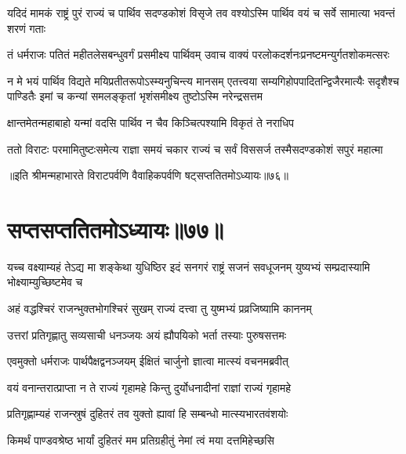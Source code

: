 \threelineshloka
{यदिदं मामकं राष्ट्रं पुरं राज्यं च पार्थिव}
{सदण्डकोशं विसृजे तव वश्योऽस्मि पार्थिव}
{वयं च सर्वे सामात्या भवन्तं शरणं गताः}



\twolineshloka
{तं धर्मराजः पतितं महीतलेसबन्धुवर्गं प्रसमीक्ष्य पार्थिवम्}
{उवाच वाक्यं परलोकदर्शनःप्रनष्टमन्युर्गतशोकमत्सरः}


\threelineshloka
{न मे भयं पार्थिव विद्यते मयिप्रतीतरूपोऽस्म्यनुचिन्त्य मानसम्}
{एतत्त्वया सम्यगिहोपपादितन्द्विजैरमात्यैः सदृशैश्च पाण्डितैः}
{इमां च कन्यां समलङ्कृतां भृशंसमीक्ष्य तुष्टोऽस्मि नरेन्द्रसत्तम}


\twolineshloka
{क्षान्तमेतन्महाबाहो यन्मां वदसि पार्थिव}
{न चैव किञ्चित्पश्यामि विकृतं ते नराधिप}



\twolineshloka
{ततो विराटः परमामितुष्टःसमेत्य राज्ञा समयं चकार}
{राज्यं च सर्वं विससर्ज तस्मैसदण्डकोशं सपुरं महात्मा}

॥इति श्रीमन्महाभारते विराटपर्वणि वैवाहिकपर्वणि षट्सप्ततितमोऽध्यायः॥७६॥

\chapter{सप्तसप्ततितमोऽध्यायः॥७७॥}

\threelineshloka
{यच्च वक्ष्याम्यहं तेऽद्य मा शङ्केथा युधिष्ठिर}
{इदं सनगरं राष्ट्रं सजनं सवधूजनम्}
{युष्यभ्यं सम्प्रदास्यामि भोक्ष्याम्युच्छिष्टमेव च}


\twolineshloka
{अहं वद्धश्चिरं राजन्भुक्तभोगश्चिरं सुखम्}
{राज्यं दत्त्वा तु युष्मभ्यं प्रव्रजिष्यामि काननम्}


\twolineshloka
{उत्तरां प्रतिगृह्णातु सव्यसाची धनञ्जयः}
{अयं ह्यौपयिको भर्ता तस्याः पुरुषसत्तमः}



\twolineshloka
{एवमुक्तो धर्मराजः पार्थपैक्षद्वनञ्जयम्}
{ईक्षितं चार्जुनो ज्ञात्वा मात्स्यं वचनमब्रवीत्}


\twolineshloka
{वयं वनान्तरात्प्राप्ता न ते राज्यं गृहामहे}
{किन्तु दुर्योधनादीनां राज्ञां राज्यं गृहामहे}


\twolineshloka
{प्रतिगृह्णाम्यहं राजन्स्रुषं दुहितरं तव}
{युक्तो ह्यावां हि सम्बन्धो मात्स्यभारतवंशयोः}




\twolineshloka
{किमर्थं पाण्डवश्रेष्ठ भार्यां दुहितरं मम}
{प्रतिग्रहीतुं नेमां त्वं मया दत्तमिहेच्छसि}

